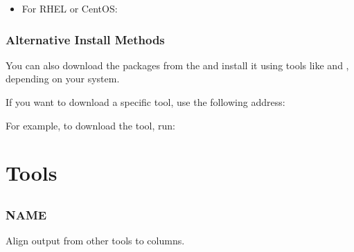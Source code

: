 \documentclass[letterpaper,10pt,english]{sphinxmanual}
\begin{document}
\begin{enumerate}
\begin{itemize}
\item {} 
For RHEL or CentOS:

\begin{sphinxVerbatim}[commandchars=\\\{\}]
   
   
\end{sphinxVerbatim}

\end{itemize}

\end{enumerate}


\section{Alternative Install Methods}
\label{\detokenize{installation:alternative-install-methods}}
You can also download the packages from the
and install it using tools like  and ,
depending on your system.

If you want to download a specific tool, use the following address:

For example, to download the  tool, run:

\begin{sphinxVerbatim}[commandchars=\\\{\}]
 
\end{sphinxVerbatim}


\part{Tools}
\label{\detokenize{index:tools}}

\chapter{}
\label{\detokenize{mariadb-align-output:mariadb-align-output}}\label{\detokenize{mariadb-align-output::doc}}

\section{NAME}
\label{\detokenize{mariadb-align-output:name}}
 \sphinxhyphen{} Align output from other tools to columns.
\end{document}
